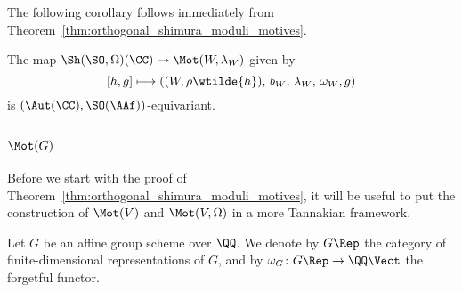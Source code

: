 The following corollary follows immediately from Theorem~\ref{thm:orthogonal_shimura_moduli_motives}.

\begin{corollary}\label{cor:moduli_polarized_motives}
The map $\Sh(\SO,\Omega)(\CC) \rightarrow \Mot(W,\lambda_W)$ given by
$$
[h,g] \longmapsto ((W,\rho \wtilde{h}),\, b_W,\, \lambda_W,\, \omega_W,g)
$$ 
is $(\Aut(\CC),\SO(\AAf))$-equivariant.
\end{corollary}




\subsection{$\Mot(G)$}
Before we start with the proof of Theorem~\ref{thm:orthogonal_shimura_moduli_motives}, it will be useful to put the construction of $\Mot(V)$ and $\Mot(V,\Omega)$ in a more Tannakian framework.

Let $G$ be an affine group scheme over $\QQ$. We denote by $G\Rep$ the category of finite-dimensional representations of $G$, and by $\omega_G\colon G\Rep \rightarrow \QQ\Vect$ the forgetful functor.

